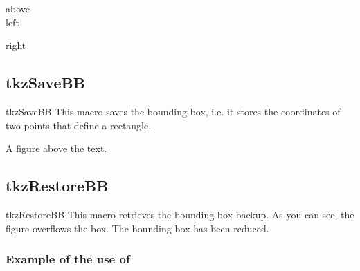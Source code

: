 \begin{tkzexample}[latex=8cm,small]
above\\
left
right
\end{tkzexample}
\subsection{tkzSaveBB}{}

\begin{NewMacroBox}{tkzSaveBB}{}%
This macro saves the bounding box, i.e. it stores the coordinates of two points
that define a rectangle.
\end{NewMacroBox}

\begin{tkzexample}[latex=7cm,small]
A figure above the text.
\end{tkzexample}

\subsection{tkzRestoreBB}

\begin{NewMacroBox}{tkzRestoreBB}{}
This macro retrieves the bounding box backup. As you can see, the figure
overflows the box. The bounding box has been reduced.
\end{NewMacroBox}

\subsubsection{Example of the use of }

